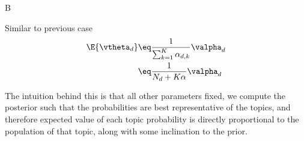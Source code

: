 \documentclass{article}
\begin{document}
\begin{question}
\begin{qpart}{B}
\begin{enumerate}[label=\bt{\theenumi.}]

				Similar to previous case
				\begin{align*}
					\E{\vtheta_d} &\eq \frac{1}{\sum_{k = 1}^K \alpha_{d, k}} \valpha_d \\
					&\eq \frac{1}{N_d + K \alpha} \valpha_d
				\end{align*}

				The intuition behind this is that all other parameters fixed, we compute the posterior such that the probabilities are best representative of the topics, and therefore expected value of each topic probability is directly proportional to the population of that topic, along with some inclination to the prior.

		\end{enumerate}

	\end{qpart}

\end{question}
\end{document}

